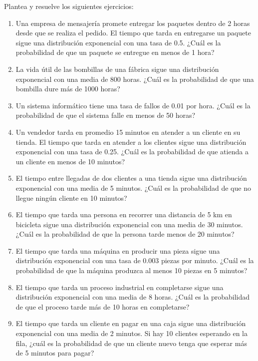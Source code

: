 \begin{Ejer}
Plantea y resuelve los siguientes ejercicios:

\begin{enumerate}
    \item Una empresa de mensajería promete entregar los paquetes dentro de 2 horas desde que se realiza el pedido. El tiempo que tarda en entregarse un paquete sigue una distribución exponencial con una tasa de 0.5. ¿Cuál es la probabilidad de que un paquete se entregue en menos de 1 hora?

    \item La vida útil de las bombillas de una fábrica sigue una distribución exponencial con una media de 800 horas. ¿Cuál es la probabilidad de que una bombilla dure más de 1000 horas?

    \item Un sistema informático tiene una tasa de fallos de 0.01 por hora. ¿Cuál es la probabilidad de que el sistema falle en menos de 50 horas?

    \item Un vendedor tarda en promedio 15 minutos en atender a un cliente en su tienda. El tiempo que tarda en atender a los clientes sigue una distribución exponencial con una tasa de 0.25. ¿Cuál es la probabilidad de que atienda a un cliente en menos de 10 minutos?

    \item El tiempo entre llegadas de dos clientes a una tienda sigue una distribución exponencial con una media de 5 minutos. ¿Cuál es la probabilidad de que no llegue ningún cliente en 10 minutos?

    \item El tiempo que tarda una persona en recorrer una distancia de 5 km en bicicleta sigue una distribución exponencial con una media de 30 minutos. ¿Cuál es la probabilidad de que la persona tarde menos de 20 minutos?

    \item El tiempo que tarda una máquina en producir una pieza sigue una distribución exponencial con una tasa de 0.003 piezas por minuto. ¿Cuál es la probabilidad de que la máquina produzca al menos 10 piezas en 5 minutos?

    \item El tiempo que tarda un proceso industrial en completarse sigue una distribución exponencial con una media de 8 horas. ¿Cuál es la probabilidad de que el proceso tarde más de 10 horas en completarse?

    \item El tiempo que tarda un cliente en pagar en una caja sigue una distribución exponencial con una media de 2 minutos. Si hay 10 clientes esperando en la fila, ¿cuál es la probabilidad de que un cliente nuevo tenga que esperar más de 5 minutos para pagar?


\end{enumerate}
\end{Ejer}
